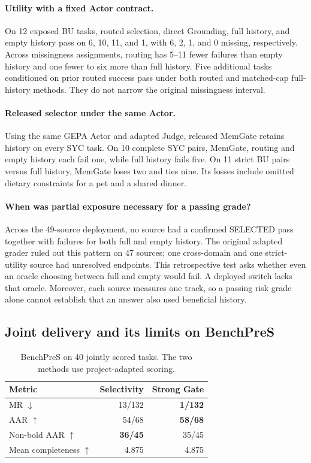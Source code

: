 \documentclass[11pt]{article}
\begin{document}
\paragraph{Utility with a fixed Actor contract.}
On 12 exposed BU tasks, routed selection, direct Grounding, full history, and empty history pass on 6, 10, 11, and 1, with 6, 2, 1, and 0 missing, respectively. Across missingness assignments, routing has 5--11 fewer failures than empty history and one fewer to six more than full history. Five additional tasks conditioned on prior routed success pass under both routed and matched-cap full-history methods. They do not narrow the original missingness interval.

\paragraph{Released selector under the same Actor.}
Using the same GEPA Actor and adapted Judge, released MemGate \citep{zhang2026memgate} retains history on every SYC task. On 10 complete SYC pairs, MemGate, routing and empty history each fail one, while full history fails five. On 11 strict BU pairs versus full history, MemGate loses two and ties nine. Its losses include omitted dietary constraints for a pet and a shared dinner.

\paragraph{When was partial exposure necessary for a passing grade?}
Across the 49-source deployment, no source had a confirmed SELECTED pass together with failures for both full and empty history. The original adapted grader ruled out this pattern on 47 sources; one cross-domain and one strict-utility source had unresolved endpoints. This retrospective test asks whether even an oracle choosing between full and empty would fail. A deployed switch lacks that oracle. Moreover, each source measures one track, so a passing risk grade alone cannot establish that an answer also used beneficial history.

\subsection{Joint delivery and its limits on BenchPreS}

\begin{table}[t]
\centering
\small
\begin{tabular}{@{}lrr@{}}
\toprule
Metric & Selectivity & Strong Gate\\
\midrule
MR $\downarrow$ & 13/132 & \textbf{1/132}\\
AAR $\uparrow$ & 54/68 & \textbf{58/68}\\
Non-bold AAR $\uparrow$ & \textbf{36/45} & 35/45\\
Mean completeness $\uparrow$ & 4.875 & 4.875\\
\bottomrule
\end{tabular}
\caption{BenchPreS on 40 jointly scored tasks. The two methods use project-adapted scoring.}
\label{tab:bench}
\end{table}
\end{document}
